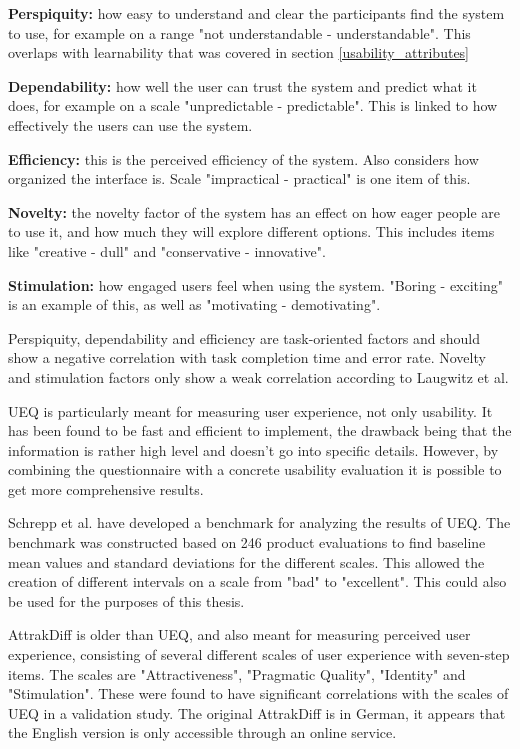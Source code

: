 \textbf{Perspiquity:} how easy to understand and clear the participants find the system to use, for example on a range "not understandable - understandable". This overlaps with learnability that was covered in section \ref{usability_attributes}

\textbf{Dependability:} how well the user can trust the system and predict what it does, for example on a scale "unpredictable - predictable". This is linked to how effectively the users can use the system.

\textbf{Efficiency:} this is the perceived efficiency of the system. Also considers how organized the interface is. Scale "impractical - practical" is one item of this.

\textbf{Novelty:} the novelty factor of the system has an effect on how eager people are to use it, and how much they will explore different options. This includes items like "creative - dull" and "conservative - innovative".

\textbf{Stimulation:} how engaged users feel when using the system. "Boring - exciting" is an example of this, as well as "motivating - demotivating".

Perspiquity, dependability and efficiency are task-oriented factors and should show a negative correlation with task completion time and error rate. Novelty and stimulation factors only show a weak correlation according to Laugwitz et al. \cite{laugwitz2008construction}

UEQ is particularly meant for measuring user experience, not only usability. It has been found to be fast and efficient to implement, the drawback being that the information is rather high level and doesn't go into specific details. However, by combining the questionnaire with a concrete usability evaluation it is possible to get more comprehensive results. \cite{schrepp2014applying, rauschenberger2013efficient}

Schrepp et al. have developed a benchmark for analyzing the results of UEQ. The benchmark was constructed based on 246 product evaluations to find baseline mean values and standard deviations for the different scales. This allowed the creation of different intervals on a scale from "bad" to "excellent". This could also be used for the purposes of this thesis. \cite{schrepp2017construction}

AttrakDiff is older than UEQ, and also meant for measuring perceived user experience, consisting of several different scales of user experience with seven-step items. The scales are "Attractiveness", "Pragmatic Quality", "Identity" and "Stimulation". These were found to have significant correlations with the scales of UEQ in a validation study. \cite{laugwitz2008construction} The original AttrakDiff is in German, it appears that the English version is only accessible through an online service. \cite{attrakdiff}

